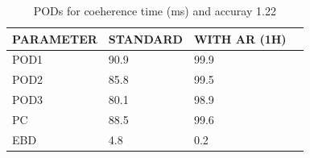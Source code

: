 \begin{table}[]
\begin{center}
\begin{tabular}{|l|l|l|l|}
\hline
\multicolumn{1}{|c|}{\cellcolor[HTML]{C0C0C0}\textbf{PARAMETER}} & \multicolumn{1}{c|}{\cellcolor[HTML]{C0C0C0}\textbf{STANDARD}} & \multicolumn{1}{c|}{\cellcolor[HTML]{C0C0C0}\textbf{WITH AR (1H)}} \\
\hline
\cellcolor[HTML]{C0C0C0}POD1  & 90.9                                & 99.9         \\
\cellcolor[HTML]{C0C0C0}POD2  & 85.8                                & 99.5         \\
\cellcolor[HTML]{C0C0C0}POD3  & 80.1                                & 98.9         \\
\cellcolor[HTML]{C0C0C0}PC    & 88.5                                  & 99.6           \\
\cellcolor[HTML]{C0C0C0}EBD   & 4.8                                 & 0.2          \\
\hline
\end{tabular}
\caption{PODs for coeherence time (ms) and accuray 1.22}
\end{center}
\end{table}
